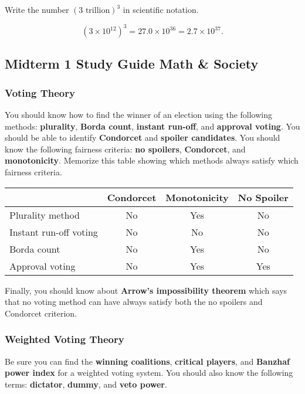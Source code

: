 \documentclass[11pt]{exam}
\begin{document}
\begin{questions}
\question Write the number $(3 \text{ trillion})^3$ in scientific notation.
\begin{solution}
$$(3 \times 10^{12})^3 = 27.0 \times 10^{36} = 2.7 \times 10^{37}.$$
\end{solution}
\vfill
\end{questions}

\newpage
\subsection*{Midterm 1 Study Guide \hfill Math \& Society}

\subsubsection*{Voting Theory}

You should know how to find the winner of an election using the following methods: \textbf{plurality}, \textbf{Borda count}, \textbf{instant run-off}, and \textbf{approval voting}.  You should be able to identify \textbf{Condorcet} and \textbf{spoiler candidates}.  You should know the following fairness criteria: \textbf{no spoilers}, \textbf{Condorcet}, and \textbf{monotonicity}. Memorize this table showing which methods always satisfy which fairness criteria.

\begin{center}
\begin{tabular}{l|ccc} 
~ & Condorcet & Monotonicity & No Spoiler  \\ \hline
Plurality method & No & Yes & No \\
Instant run-off voting & No & No & No \\
Borda count & No & Yes & No \\
Approval voting & No & Yes & Yes \\ 
\end{tabular}
\end{center}

Finally, you should know about \textbf{Arrow's impossibility theorem} which says that no voting method can have always satisfy both the no spoilers and Condorcet criterion.  

\subsubsection*{Weighted Voting Theory}

Be sure you can find the \textbf{winning coalitions}, \textbf{critical players}, and \textbf{Banzhaf power index} for a weighted voting system.  You should also know the following terms: \textbf{dictator}, \textbf{dummy}, and \textbf{veto power}. 
\end{document}
